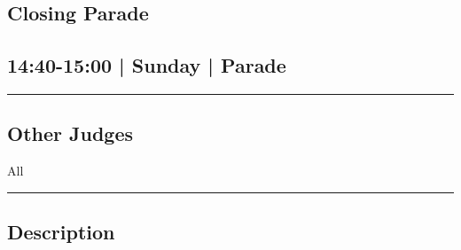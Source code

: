 \documentclass[10pt, A5]{article}
\begin{document}
		\begin{framed}
			\begin{minipage}{\textwidth}

			\setcounter{section}{118}
							\section{Closing Parade}
						
			\subsection*{14:40-15:00 | Sunday | Parade}

			\vspace{0.25cm}
			\hrule
			\vspace{0.25cm}


			\subsection*{Other Judges}
							All

					\vspace{0.25cm}
			\hrule
			\vspace{0.25cm}

			\begin{minipage}{\textwidth}
			\subsection*{\faListAlt \: Description}
			
			\end{minipage}


	\end{minipage}
	\end{framed}

	
	
	

	\clearpage
\end{document}

